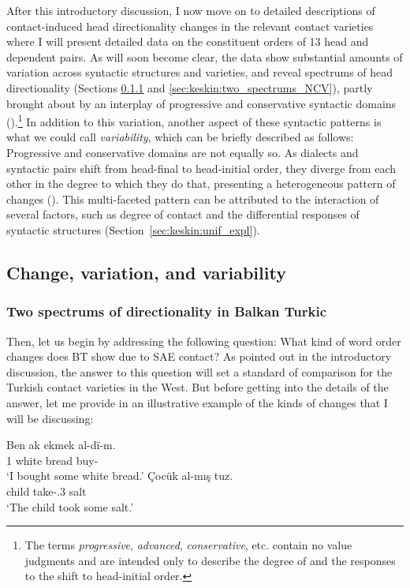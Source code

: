 \documentclass[output=paper,colorlinks,citecolor=brown]{langscibook}
\begin{document}
After this introductory discussion, I now move on to detailed descriptions of contact-induced head directionality changes in the relevant contact varieties where I will present detailed data on the constituent orders of 13 head and dependent pairs. As will soon become clear, the data show substantial amounts of variation across syntactic structures and varieties, and reveal spectrums of head directionality (Sections \ref{sec:keskin:two_spectrums_BT} and \ref{sec:keskin:two_spectrums_NCV}), partly brought about by an interplay of progressive and conservative syntactic domains ().\footnote{The terms \textit{progressive}, \textit{advanced}, \textit{conservative}, etc. contain no value judgments and are intended only to describe the degree of and the responses to the shift to head-initial order.} In addition to this variation, another aspect of these syntactic patterns is what we could call \textit{variability}, which can be briefly described as follows: Progressive and conservative domains are not equally so. As dialects and syntactic pairs shift from head-final to head-initial order, they diverge from each other in the degree to which they do that, presenting a heterogeneous pattern of changes (). This multi-faceted pattern can be attributed to the interaction of several factors, such as degree of contact and the differential responses of syntactic structures (Section~\ref{sec:keskin:unif_expl}).

\subsection{Change, variation, and variability}
\label{sec:keskin:HD_BT_NCV}

\subsubsection{Two spectrums of directionality in Balkan Turkic}
\label{sec:keskin:two_spectrums_BT}

Then, let us begin by addressing the following question: What kind of word order changes does BT show due to SAE contact? As pointed out in the introductory discussion, the answer to this question will set a standard of comparison for the Turkish contact varieties in the West. But before getting into the details of the answer, let me provide in  an illustrative example of the kinds of changes that I will be discussing:

\ea\label{ex:keskin:OVVO}
  \ea\label{ex:keskin:Kardzali}
\gll Ben ak ekmek al-dï-m.\\
1\Sg{} white bread buy-\Sg\\
\glt `I bought some white bread.' \citep[187]{Hazai.1960}
  \ex\label{ex:keskin:VO_Gagauz}
\gll Çocük al-mış tuz.\\
child take-\Evid.3\Sg{} salt\\
\glt `The child took some salt.' \citep[137]{Ozkan.2007}
  \z
\z
\end{document}
